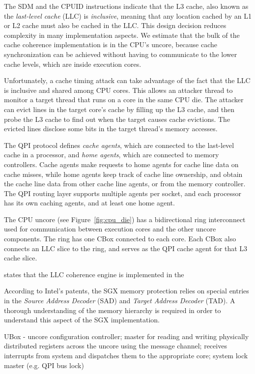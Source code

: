 The SDM and the CPUID instructions indicate that the L3 cache, also known as
the \textit{last-level cache} (LLC) is \textit{inclusive}, meaning that any
location cached by an L1 or L2 cache must also be cached in the LLC. This
design decision reduces complexity in many implementation aspects. We estimate
that the bulk of the cache coherence implementation is in the CPU's uncore,
because cache synchronization can be achieved without having to communicate to
the lower cache levels, which are inside execution cores.

Unfortunately, a cache timing attack can take advantage of the fact that the
LLC is inclusive and shared among CPU cores. This allows an attacker thread
to monitor a target thread that runs on a core in the same CPU die. The
attacker can evict lines in the target core's cache by filling up the L3 cache,
and then probe the L3 cache to find out when the target causes cache evictions.
The evicted lines disclose some bits in the target thread's memory accesses.

The QPI protocol defines \textit{cache agents}, which are connected to the
last-level cache in a processor, and \textit{home agents}, which are connected
to memory controllers. Cache agents make requests to home agents for cache line
data on cache misses, while home agents keep track of cache line ownership, and
obtain the cache line data from other cache line agents, or from the memory
controller. The QPI routing layer supports multiple agents per socket, and each
processor has its own caching agents, and at least one home agent.

The CPU uncore (see Figure~\ref{fig:cpu_die}) has a bidirectional ring
interconnect used for communication between execution cores and the other
uncore components. The ring has one CBox connected to each core. Each CBox also
connects an LLC slice to the ring, and serves as the QPI cache agent for that
L3 cache slice.


\cite{intel2014datasheet} states that the LLC coherence engine is implemented
in the

According to Intel's patents, the SGX memory protection relies on special
entries in the \textit{Source Address Decoder} (SAD) and \textit{Target Address
Decoder} (TAD).  A thorough understanding of the memory hierarchy is required
in order to understand this aspect of the SGX implementation.

UBox - uncore configuration controller; master for reading and writing
physically distributed registers across the uncore using the message
channel; receives interrupts from system and dispatches them to the
appropriate core; system lock master (e.g. QPI bus lock)

